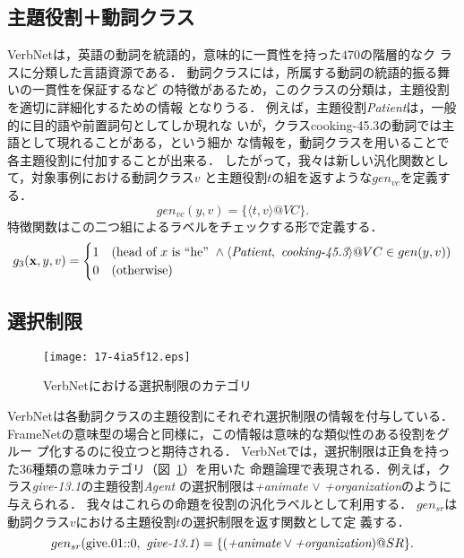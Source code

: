 \documentclass[japanese]{jnlp_1.4}
\begin{document}
\subsection{主題役割＋動詞クラス}

VerbNetは，英語の動詞を統語的，意味的に一貫性を持った$470$の階層的なク
ラスに分類した言語資源である．
動詞クラスには，所属する動詞の統語的振る舞いの一貫性を保証するなど
の特徴があるため，このクラスの分類は，主題役割を適切に詳細化するための情報
となりうる．
例えば，主題役割{\it Patient}は，一般的に目的語や前置詞句としてしか現れな
いが，クラスcooking-45.3の動詞では主語として現れることがある，という細か
な情報を，動詞クラスを用いることで各主題役割に付加することが出来る．
したがって，我々は新しい汎化関数として，対象事例における動詞クラス$v$
と主題役割$t$の組を返すような$gen_{vc}$を定義する．
\begin{equation}
gen_{vc}(y,v) = \{\langle t, v\rangle@VC\}.
\end{equation}
特徴関数はこの二つ組によるラベルをチェックする形で定義する．
\begin{equation}
 g_3(\mathbf{x},y,v) = 
  \begin{cases}
   1 & (\mbox{head of }x\mbox{ is ``he''}~\wedge 
   \langle\mbox{{\it Patient}},\mbox{ {\it cooking-45.3}}\rangle@VC \in gen(y,v) )\\
   0 & (\mbox{otherwise})
  \end{cases}
\end{equation}


\subsection{選択制限}
\label{sec:selectional-restriction}

\begin{figure}[b]
\begin{center}
\texttt{[image: 17-4ia5f12.eps]}
\end{center}
\caption{VerbNetにおける選択制限のカテゴリ}
\label{fig:selectional-restriction-list}
\end{figure}

VerbNetは各動詞クラスの主題役割にそれぞれ選択制限の情報を付与している．
FrameNetの意味型の場合と同様に，この情報は意味的な類似性のある役割をグルー
プ化するのに役立つと期待される．
VerbNetでは，選択制限は正負を持った$36$種類の意味カテゴリ（図~\ref{fig:selectional-restriction-list}）を用いた
命題論理で表現される．例えば，クラス{\it give-13.1}の主題役割{\it Agent}
の選択制限は{\it +animate} $\vee$ {\it +organization}のように与えられる．
我々はこれらの命題を役割の汎化ラベルとして利用する．
$gen_{sr}$は動詞クラス$v$における主題役割$t$の選択制限を返す関数として定
義する．
\begin{equation}
gen_{sr}(\mbox{give.01::0},\mbox{ {\it give-13.1}}) = \{ \mbox{({\it +animate}}\vee\mbox{{\it
 +organization})}@SR \}.
\end{equation}
\end{document}
